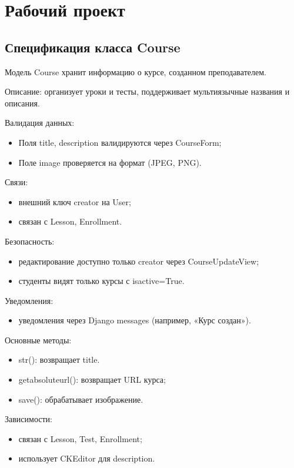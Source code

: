\section{Рабочий проект}

\subsection{Спецификация класса Course}

Модель Course хранит информацию о курсе, созданном преподавателем.

Описание: организует уроки и тесты, поддерживает мультиязычные названия и описания.

Валидация данных:
	\begin{itemize}
		\item Поля title, description валидируются через CourseForm;
		\item Поле image проверяется на формат (JPEG, PNG).
	\end{itemize}
	
Связи:
	\begin{itemize}
		\item внешний ключ creator на User;
		\item связан с Lesson, Enrollment.
	\end{itemize}
		
Безопасность:
	\begin{itemize}
		\item редактирование доступно только creator через CourseUpdateView;
		\item студенты видят только курсы с isactive=True.
	\end{itemize}
	
Уведомления:
	\begin{itemize}
		\item уведомления через Django messages (например, «Курс создан»).
	\end{itemize}
	
Основные методы:
	\begin{itemize}
		\item str(): возвращает title.
		\item getabsoluteurl(): возвращает URL курса;
		\item save(): обрабатывает изображение.
	\end{itemize}
	
Зависимости:
	\begin{itemize}
		\item связан с Lesson, Test, Enrollment;
		\item использует CKEditor для description.
	\end{itemize}


